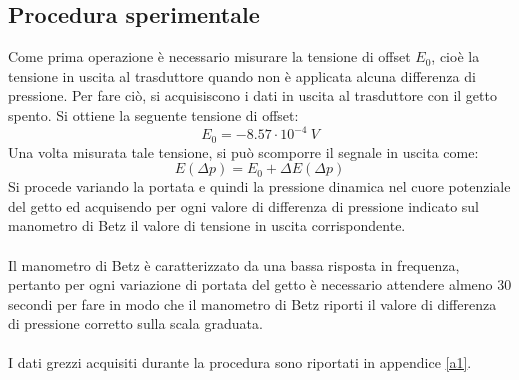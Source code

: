 \subsection{Procedura sperimentale}
Come prima operazione è necessario misurare la tensione di offset $E_0$, cioè la tensione in uscita al trasduttore quando non è applicata alcuna differenza di pressione. Per fare ciò, si acquisiscono i dati in uscita al trasduttore con il getto spento. Si ottiene la seguente tensione di offset:
\begin{equation*}
    E_0 = -8.57\cdot 10^{-4}\ V
\end{equation*}
Una volta misurata tale tensione, si può scomporre il segnale in uscita come:
\begin{equation*}
    E(\Delta p) = E_0 + \Delta E(\Delta p)
\end{equation*}
Si procede variando la portata e quindi la pressione dinamica nel cuore potenziale del getto ed acquisendo per ogni valore di differenza di pressione indicato sul manometro di Betz il valore di tensione in uscita corrispondente.\\\\
Il manometro di Betz è caratterizzato da una bassa risposta in frequenza, pertanto per ogni variazione di portata del getto è necessario attendere almeno 30 secondi per fare in modo che il manometro di Betz riporti il valore di differenza di pressione corretto sulla scala graduata.\\\\
I dati grezzi acquisiti durante la procedura sono riportati in appendice \ref{a1}.\\\\

